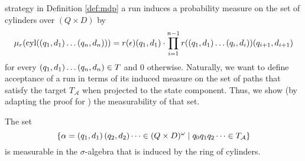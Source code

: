 strategy in Definition \ref{def:mdp} a run induces a probability measure on the
set of cylinders over $(Q\times D)$ by
\begin{equation}
  \mu_{r}(\operatorname{cyl}(\left(q_{1},d_{1}\right)\dots\left(q_{n},d_{n}\right)))
    = r(\epsilon)(q_{1},d_{1})\cdot\prod\limits_{i = 1}^{n - 1}
    r(\left(q_{1},d_{1}\right)\dots\left(q_{i},d_{i}\right))(q_{i+1},d_{i+1})
\end{equation}
for every $\left(q_{1},d_{1}\right)\dots\left(q_{n},d_{n}\right)\in T$ and $0$ otherwise.
Naturally, we want to define acceptance of a run in terms of its induced
measure on the set of paths that satisfy the target $T_{\mathcal{A}}$ when
projected to the state component. Thus, we show (by adapting the proof for
\cite[Proposition 6]{RandAutoInfTrees}) the measurability of that set.
\begin{lemma}[Measurability]
  The set
  \begin{equation*}
    \left\{\alpha = \left(q_{1},d_{1}\right)\left(q_{2},d_{2}\right)\dots\in
    (Q\times D)^{\omega}\mid q_{0}q_{1}q_{2}\dots\in T_{\mathcal{A}}\right\}
  \end{equation*} is measurable in the $\sigma$-algebra that is induced by the
  ring of cylinders.
  \label{lem:measureabilityAcceptance}
\end{lemma}
